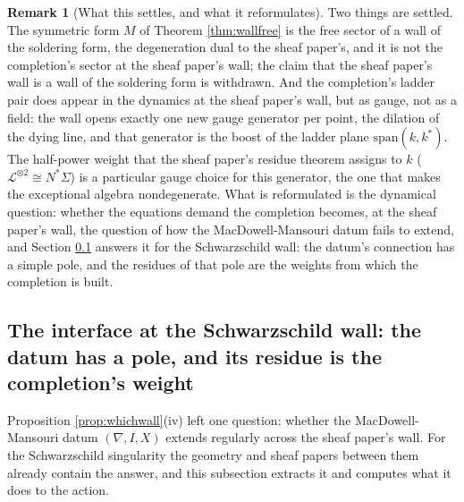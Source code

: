 \documentclass[11pt]{article}
\theoremstyle{definition}
\newtheorem{remark}[theorem]{Remark}
\begin{document}
\begin{remark}[What this settles, and what it reformulates]\label{rem:whichwall}
Two things are settled. The symmetric form $M$ of Theorem \ref{thm:wallfree} is the free sector of a wall of the soldering form, the degeneration dual to the sheaf paper's, and it is not the completion's sector at the sheaf paper's wall; the claim that the sheaf paper's wall is a wall of the soldering form is withdrawn. And the completion's ladder pair does appear in the dynamics at the sheaf paper's wall, but as gauge, not as a field: the wall opens exactly one new gauge generator per point, the dilation of the dying line, and that generator is the boost of the ladder plane $\mathrm{span}(k, k^*)$. The half-power weight that the sheaf paper's residue theorem assigns to $k$ ($\mathcal{L}^{\otimes 2} \cong N^*\Sigma$) is a particular gauge choice for this generator, the one that makes the exceptional algebra nondegenerate. What is reformulated is the dynamical question: whether the equations demand the completion becomes, at the sheaf paper's wall, the question of how the MacDowell-Mansouri datum fails to extend, and Section \ref{subsec:kasner} answers it for the Schwarzschild wall: the datum's connection has a simple pole, and the residues of that pole are the weights from which the completion is built.
\end{remark}

\subsection{The interface at the Schwarzschild wall: the datum has a pole, and its residue is the completion's weight}\label{subsec:kasner}

Proposition \ref{prop:whichwall}(iv) left one question: whether the MacDowell-Mansouri datum $(\nabla, I, X)$ extends regularly across the sheaf paper's wall. For the Schwarzschild singularity the geometry and sheaf papers between them already contain the answer, and this subsection extracts it and computes what it does to the action.
\end{document}
